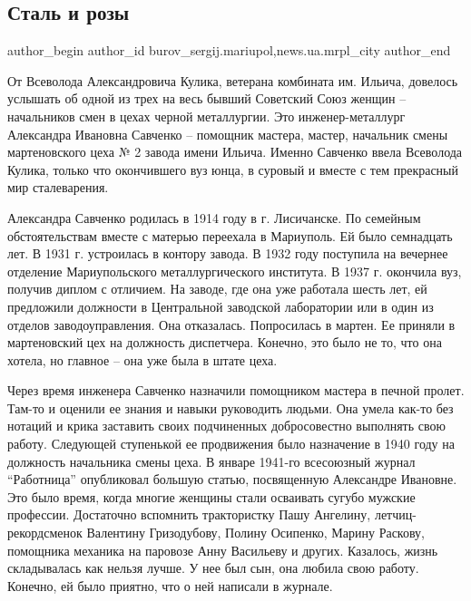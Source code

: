  
 
 
 
 
 
\subsection{Сталь и розы}
\label{sec:16_02_2018.stz.news.ua.mrpl_city.1.stal_i_rozy}
 
\ifcmt
 author_begin
   author_id burov_sergij.mariupol,news.ua.mrpl_city
 author_end
\fi

От Всеволода Александровича Кулика, ветерана комбината им. Ильича, довелось
услышать об одной из трех на весь бывший Советский Союз женщин – начальников
смен в цехах черной металлургии. Это инженер-металлург Александра Ивановна
Савченко – помощник мастера, мастер, начальник смены мартеновского цеха № 2
завода имени Ильича. Именно Савченко ввела Всеволода Кулика, только что
окончившего вуз юнца, в суровый и вместе с тем прекрасный мир сталеварения.

Александра Савченко родилась в 1914 году в г. Лисичанске. По семейным
обстоятельствам вместе с матерью переехала в Мариуполь. Ей было семнадцать лет.
В 1931 г. устроилась в контору завода. В 1932 году поступила на вечернее
отделение Мариупольского металлургического  института. В 1937 г. окончила вуз,
получив диплом с отличием. На заводе, где она уже работала шесть лет, ей
предложили должности в Центральной заводской лаборатории или в один из отделов
заводоуправления. Она отказалась. Попросилась в мартен. Ее приняли в
мартеновский цех на должность диспетчера. Конечно, это было не то, что она
хотела, но главное – она уже была в штате цеха.


Через время инженера Савченко назначили помощником мастера в печной пролет.
Там-то и оценили ее знания и навыки руководить людьми. Она умела как-то без
нотаций и крика заставить своих подчиненных добросовестно выполнять свою
работу. Следующей ступенькой ее продвижения было назначение в 1940 году на
должность начальника смены цеха. В январе 1941-го всесоюзный журнал \enquote{Работница}
опубликовал большую статью, посвященную Александре Ивановне. Это было время,
когда многие женщины стали осваивать сугубо мужские профессии. Достаточно
вспомнить трактористку Пашу Ангелину, летчиц-рекордсменок Валентину
Гризодубову, Полину Осипенко, Марину Раскову, помощника механика на паровозе
Анну Васильеву и других. Казалось, жизнь складывалась как нельзя лучше. У нее
был сын, она любила свою работу. Конечно, ей было приятно, что о ней написали в
журнале.

